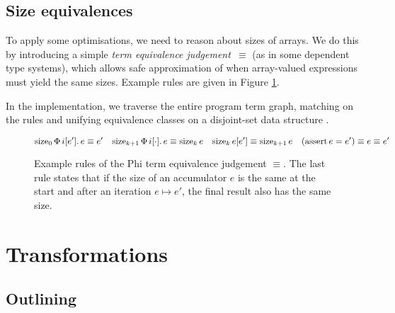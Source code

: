 \subsection{Size equivalences}

To apply some optimisations, we need to reason about sizes of arrays. We do this by introducing a simple \textit{term equivalence judgement~$\equiv$} (as in some dependent type systems), which allows safe approximation of when array-valued expressions must yield the same sizes. Example rules are given in Figure \ref{fig:term-equivalence}.

In the implementation, we traverse the entire program term graph, matching on the rules and unifying equivalence classes on a disjoint-set data structure \cite{cormen2022introduction}. 

\begin{figure}
    \centering
    $$
    \phisize{\phivec{i}{e'}{e}}{0} \equiv e'
    \quad
    \phisize{\phivec{i}{\cdot}{e}}{k+1} \equiv \phisize{e}{k}
    \quad
    \phisize{e[e']}{k} \equiv \phisize{e}{k+1}
    \quad
    (\phiasserteq{e}{e'}) \equiv e \equiv e'
    $$
    \begin{prooftree}
    \end{prooftree}
    \caption{Example rules of the Phi term equivalence judgement $\equiv$. The last rule states that if the size of an accumulator $e$ is the same at the start and after an iteration $e \mapsto e'$, the final result also has the same size.}
    \label{fig:term-equivalence}
\end{figure}


\section{Transformations}
\label{compiler-transformations}

\subsection{Outlining}

